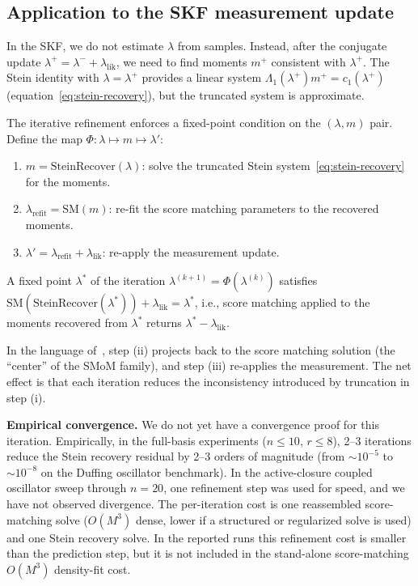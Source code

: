\documentclass{article}
\theoremstyle{definition}
\begin{document}
\subsection{Application to the SKF measurement update}

In the SKF, we do not estimate $\lambda$ from samples.
Instead, after the conjugate update $\lambda^+ = \lambda^- + \lambda_{\mathrm{lik}}$,
we need to find moments $m^+$ consistent with $\lambda^+$.
The Stein identity with $\lambda = \lambda^+$ provides a linear system
$\Lambda_1(\lambda^+) m^+ = c_1(\lambda^+)$
(equation~\eqref{eq:stein-recovery}), but the truncated system is
approximate.

The iterative refinement enforces a fixed-point condition on the
$(\lambda, m)$ pair.
Define the map $\Phi\colon \lambda \mapsto m \mapsto \lambda'$:
\begin{enumerate}[label=(\roman*), nosep]
  \item $m = \mathrm{SteinRecover}(\lambda)$:
        solve the truncated Stein system~\eqref{eq:stein-recovery}
        for the moments.
  \item $\lambda_{\mathrm{refit}} = \mathrm{SM}(m)$:
        re-fit the score matching parameters to the recovered moments.
  \item $\lambda' = \lambda_{\mathrm{refit}} + \lambda_{\mathrm{lik}}$:
        re-apply the measurement update.
\end{enumerate}
A fixed point $\lambda^*$ of the iteration
$\lambda^{(k+1)} = \Phi(\lambda^{(k)})$ satisfies
$\mathrm{SM}(\mathrm{SteinRecover}(\lambda^*)) + \lambda_{\mathrm{lik}} = \lambda^*$,
i.e., score matching applied to the moments recovered from $\lambda^*$
returns $\lambda^* - \lambda_{\mathrm{lik}}$.

In the language of~\cite{nagai2026}, step (ii) projects back to the
score matching solution (the ``center'' of the SMoM family),
and step (iii) re-applies the measurement.
The net effect is that each iteration reduces the inconsistency
introduced by truncation in step (i).

\textbf{Empirical convergence.}
We do not yet have a convergence proof for this iteration.
Empirically, in the full-basis experiments ($n \le 10$, $r \le 8$),
2--3 iterations reduce the Stein recovery residual by 2--3 orders of
magnitude (from ${\sim}10^{-5}$ to ${\sim}10^{-8}$ on the Duffing
oscillator benchmark). In the active-closure coupled oscillator sweep
through $n{=}20$, one refinement step was used for speed, and we have
not observed divergence.
The per-iteration cost is one reassembled score-matching solve
($O(M^3)$ dense, lower if a structured or regularized solve is used)
and one Stein recovery solve. In the reported runs this refinement cost
is smaller than the prediction step, but it is not included in the
stand-alone score-matching $O(M^3)$ density-fit cost.
\end{document}

